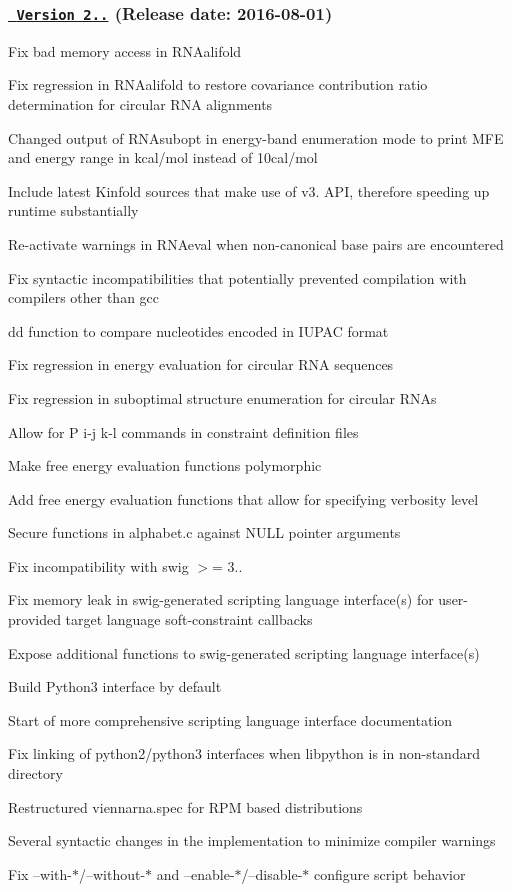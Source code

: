 \subsubsection*{\href{https://github.com/ViennaRNA/ViennaRNA/compare/v2.2.7...v2.2.8}{\texttt{ Version 2..}} (Release date\+: 2016-\/08-\/01)}


\begin{DoxyItemize}
\item Fix bad memory access in R\+N\+Aalifold
\item Fix regression in R\+N\+Aalifold to restore covariance contribution ratio determination for circular R\+NA alignments
\item Changed output of R\+N\+Asubopt in energy-\/band enumeration mode to print M\+FE and energy range in kcal/mol instead of 10cal/mol
\item Include latest Kinfold sources that make use of v3. A\+PI, therefore speeding up runtime substantially
\item Re-\/activate warnings in R\+N\+Aeval when non-\/canonical base pairs are encountered
\item Fix syntactic incompatibilities that potentially prevented compilation with compilers other than gcc
\item dd function to compare nucleotides encoded in I\+U\+P\+AC format
\item Fix regression in energy evaluation for circular R\+NA sequences
\item Fix regression in suboptimal structure enumeration for circular R\+N\+As
\item Allow for P i-\/j k-\/l commands in constraint definition files
\item Make free energy evaluation functions polymorphic
\item Add free energy evaluation functions that allow for specifying verbosity level
\item Secure functions in alphabet.\+c against N\+U\+LL pointer arguments
\item Fix incompatibility with swig $>$= 3..
\item Fix memory leak in swig-\/generated scripting language interface(s) for user-\/provided target language soft-\/constraint callbacks
\item Expose additional functions to swig-\/generated scripting language interface(s)
\item Build Python3 interface by default
\item Start of more comprehensive scripting language interface documentation
\item Fix linking of python2/python3 interfaces when libpython is in non-\/standard directory
\item Restructured viennarna.\+spec for R\+PM based distributions
\item Several syntactic changes in the implementation to minimize compiler warnings
\item Fix --with-\/$\ast$/--without-\/$\ast$ and --enable-\/$\ast$/--disable-\/$\ast$ configure script behavior
\end{DoxyItemize}


